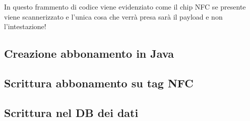In questo frammento di codice viene evidenziato come il chip NFC se presente viene scannerizzato e l'unica cosa che verrà presa sarà il payload e non l'intestazione! 
\subsection{Creazione abbonamento in Java}


\subsection{Scrittura abbonamento su tag NFC }
\subsection{Scrittura nel DB dei dati}
